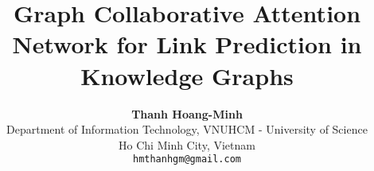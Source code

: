 \documentclass[10pt,twocolumn,letterpaper]{article}
\title{Graph Collaborative Attention Network for Link Prediction in Knowledge Graphs}
\author{\textbf{Thanh Hoang-Minh \orcidlink{0009-0007-0898-5923}}\\
Department of Information Technology, VNUHCM - University of Science\\
Ho Chi Minh City, Vietnam \\
{\tt\small hmthanhgm@gmail.com}
}
\begin{document}
\maketitle
    







{
    \small
    
    
}


% 
\end{document}
